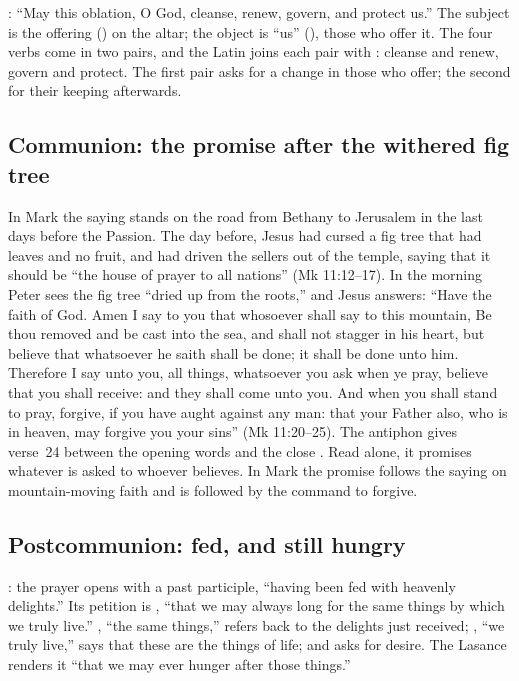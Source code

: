 : ``May this oblation, O God, cleanse, renew, govern, and protect
us.'' The subject is the offering () on the altar; the object
is ``us'' (), those who offer it. The four verbs come in two pairs,
and the Latin joins each pair with : cleanse and renew, govern and
protect. The first pair asks for a change in those who offer; the second for
their keeping afterwards.

\subsection{Communion: the promise after the withered fig tree}
\label{sec:element-communion}

In Mark the saying stands on the road from Bethany to Jerusalem in the last
days before the Passion. The day before, Jesus had cursed a fig tree that had
leaves and no fruit, and had driven the sellers out of the temple, saying that
it should be ``the house of prayer to all nations'' (Mk 11:12--17). In the
morning Peter sees the fig tree ``dried up from the roots,'' and Jesus answers:
``Have the faith of God. Amen I say to you that whosoever shall say to this
mountain, Be thou removed and be cast into the sea, and shall not stagger in
his heart, but believe that whatsoever he saith shall be done; it shall be done
unto him. Therefore I say unto you, all things, whatsoever you ask when ye
pray, believe that you shall receive: and they shall come unto you. And when
you shall stand to pray, forgive, if you have aught against any man: that your
Father also, who is in heaven, may forgive you your sins'' (Mk 11:20--25). The
antiphon gives verse~24 between the opening words  and
the close . Read alone, it promises whatever is asked to
whoever believes. In Mark the promise follows the saying on mountain-moving
faith and is followed by the command to forgive.

\subsection{Postcommunion: fed, and still hungry}
\label{sec:element-postcommunion}

: the prayer opens with a past
participle, ``having been fed with heavenly delights.'' Its petition is
, ``that we may
always long for the same things by which we truly live.'' , ``the
same things,'' refers back to the delights just received; , ``we truly live,'' says that these are the things of life; and
 asks for desire. The Lasance renders
it ``that we may ever hunger after those things.''
